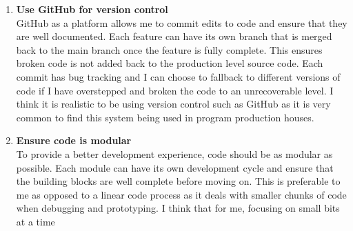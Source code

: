 \documentclass[9pt]{article}
\begin{document}
\begin{small}
\begin{enumerate}
		\item \textbf{Use GitHub for version control} \\
		GitHub as a platform allows me to commit edits to code and ensure that they are well documented. Each feature can have its own branch that is merged back to the main branch once the feature is fully complete. This ensures broken code is not added back to the production level source code. Each commit has bug tracking and I can choose to fallback to different versions of code if I have overstepped and broken the code to an unrecoverable level. I think it is realistic to be using version control such as GitHub as it is very common to find this system being used in program production houses.
		\item \textbf{Ensure code is modular} \\
		To provide a better development experience, code should be as modular as possible. Each module can have its own development cycle and ensure that the building blocks are well complete before moving on. This is preferable to me as opposed to a linear code process as it deals with smaller chunks of code when debugging and prototyping. I think that for me, focusing on small bits at a time 
	\end{enumerate}
\end{small}
\newpage
\end{document}
